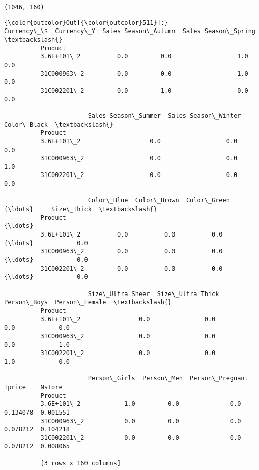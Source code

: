 \documentclass[11pt]{article}
\begin{document}
    \begin{Verbatim}[commandchars=\\\{\}]
(1046, 160)

    \end{Verbatim}

\begin{Verbatim}[commandchars=\\\{\}]
{\color{outcolor}Out[{\color{outcolor}511}]:}              Currency\_\$  Currency\_Y  Sales Season\_Autumn  Sales Season\_Spring  \textbackslash{}
          Product                                                                         
          3.6E+101\_2          0.0         0.0                  1.0                  0.0   
          31C000963\_2         0.0         0.0                  1.0                  0.0   
          31C002201\_2         0.0         1.0                  0.0                  0.0   
          
                       Sales Season\_Summer  Sales Season\_Winter  Color\_Black  \textbackslash{}
          Product                                                              
          3.6E+101\_2                   0.0                  0.0          0.0   
          31C000963\_2                  0.0                  0.0          1.0   
          31C002201\_2                  0.0                  0.0          0.0   
          
                       Color\_Blue  Color\_Brown  Color\_Green    {\ldots}     Size\_Thick  \textbackslash{}
          Product                                              {\ldots}                  
          3.6E+101\_2          0.0          0.0          0.0    {\ldots}            0.0   
          31C000963\_2         0.0          0.0          0.0    {\ldots}            0.0   
          31C002201\_2         0.0          0.0          0.0    {\ldots}            0.0   
          
                       Size\_Ultra Sheer  Size\_Ultra Thick  Person\_Boys  Person\_Female  \textbackslash{}
          Product                                                                       
          3.6E+101\_2                0.0               0.0          0.0            0.0   
          31C000963\_2               0.0               0.0          0.0            1.0   
          31C002201\_2               0.0               0.0          1.0            0.0   
          
                       Person\_Girls  Person\_Men  Person\_Pregnant    Tprice    Nstore  
          Product                                                                     
          3.6E+101\_2            1.0         0.0              0.0  0.134078  0.001551  
          31C000963\_2           0.0         0.0              0.0  0.078212  0.104218  
          31C002201\_2           0.0         0.0              0.0  0.078212  0.008065  
          
          [3 rows x 160 columns]
\end{Verbatim}
            
\end{document}
